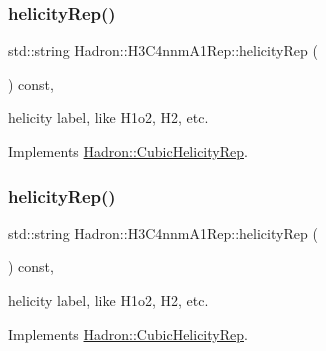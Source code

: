\mbox{\label{structHadron_1_1H3C4nnmA1Rep_a0bd69f3a04496d18380f553e0fea11b0}} 
\subsubsection{\texorpdfstring{helicityRep()}{helicityRep()}\hspace{0.1cm}{\footnotesize\ttfamily [1/2]}}
{\footnotesize\ttfamily std\+::string Hadron\+::\+H3\+C4nnm\+A1\+Rep\+::helicity\+Rep (\begin{DoxyParamCaption}{ }\end{DoxyParamCaption}) const\hspace{0.3cm}{\ttfamily [inline]}, {\ttfamily [virtual]}}

helicity label, like H1o2, H2, etc. 

Implements \mbox{\hyperlink{structHadron_1_1CubicHelicityRep_af1096946b7470edf0a55451cc662f231}{Hadron\+::\+Cubic\+Helicity\+Rep}}.

\mbox{\label{structHadron_1_1H3C4nnmA1Rep_a0bd69f3a04496d18380f553e0fea11b0}} 
\subsubsection{\texorpdfstring{helicityRep()}{helicityRep()}\hspace{0.1cm}{\footnotesize\ttfamily [2/2]}}
{\footnotesize\ttfamily std\+::string Hadron\+::\+H3\+C4nnm\+A1\+Rep\+::helicity\+Rep (\begin{DoxyParamCaption}{ }\end{DoxyParamCaption}) const\hspace{0.3cm}{\ttfamily [inline]}, {\ttfamily [virtual]}}

helicity label, like H1o2, H2, etc. 

Implements \mbox{\hyperlink{structHadron_1_1CubicHelicityRep_af1096946b7470edf0a55451cc662f231}{Hadron\+::\+Cubic\+Helicity\+Rep}}.

\mbox{\label{structHadron_1_1H3C4nnmA1Rep_acd94f02734b3fffdeddaef313469d9dc}} 
